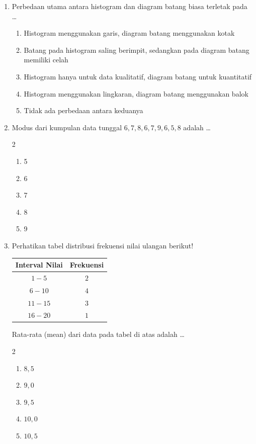 \documentclass[12pt,a4paper]{article}
\begin{document}
\begin{enumerate}[itemsep=2ex]
    \item Perbedaan utama antara histogram dan diagram batang biasa terletak pada \dots
    \begin{enumerate}[label=\Alph*.]
        \item Histogram menggunakan garis, diagram batang menggunakan kotak
        \item Batang pada histogram saling berimpit, sedangkan pada diagram batang memiliki celah
        \item Histogram hanya untuk data kualitatif, diagram batang untuk kuantitatif
        \item Histogram menggunakan lingkaran, diagram batang menggunakan balok
        \item Tidak ada perbedaan antara keduanya
    \end{enumerate}

    \item Modus dari kumpulan data tunggal $6, 7, 8, 6, 7, 9, 6, 5, 8$ adalah \dots
    \begin{multicols}{2}
    \begin{enumerate}[label=\Alph*.]
        \item 5
        \item 6
        \item 7
        \item 8
        \item 9
    \end{enumerate}
    \end{multicols}

    \item Perhatikan tabel distribusi frekuensi nilai ulangan berikut!\\
    \begin{center}
    \begin{tabular}{|c|c|}
    \hline
    \rowcolor{cyan!20}
    \textbf{Interval Nilai} & \textbf{Frekuensi} \\
    \hline
    $1 - 5$ & $2$ \\
    $6 - 10$ & $4$ \\
    $11 - 15$ & $3$ \\
    $16 - 20$ & $1$ \\
    \hline
    \end{tabular}
    \end{center}
    Rata-rata (mean) dari data pada tabel di atas adalah \dots
    \begin{multicols}{2}
    \begin{enumerate}[label=\Alph*.]
        \item $8,5$
        \item $9,0$
        \item $9,5$
        \item $10,0$
        \item $10,5$
    \end{enumerate}
    \end{multicols}


\end{enumerate}
\end{document}
